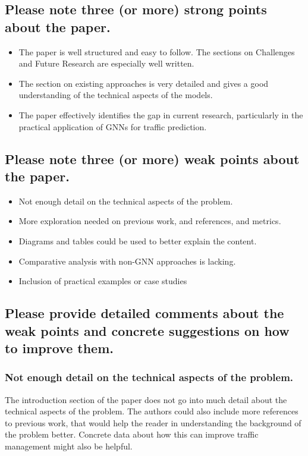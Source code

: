 \documentclass[12pt]{article}
\begin{document}
\subsection*{Please note three (or more) strong points about the paper.}
\begin{itemize}
    \item The paper is well structured and easy to follow. The sections on Challenges and Future Research are especially well written.
    \item The section on existing approaches is very detailed and gives a good understanding of the technical aspects of the models.
    \item The paper effectively identifies the gap in current research, particularly in the practical application of GNNs for traffic prediction.
\end{itemize}


\subsection*{Please note three (or more) weak points about the paper.}
 \begin{itemize}
    \item Not enough detail on the technical aspects of the problem.
    \item More exploration needed on previous work, and references, and metrics.
    \item Diagrams and tables could be used to better explain the content.
    \item Comparative analysis with non-GNN approaches is lacking.
    \item Inclusion of practical examples or case studies
 \end{itemize}


\subsection*{Please provide detailed comments about the weak points and concrete suggestions on how to improve them.}
\subsubsection*{Not enough detail on the technical aspects of the problem.}
The introduction section of the paper does not go into much detail about the technical aspects of the problem. The authors could also include
more references to previous work, that would help the reader in understanding the background of the problem better. Concrete data about how 
this can improve traffic management might also be helpful. 
\end{document}
